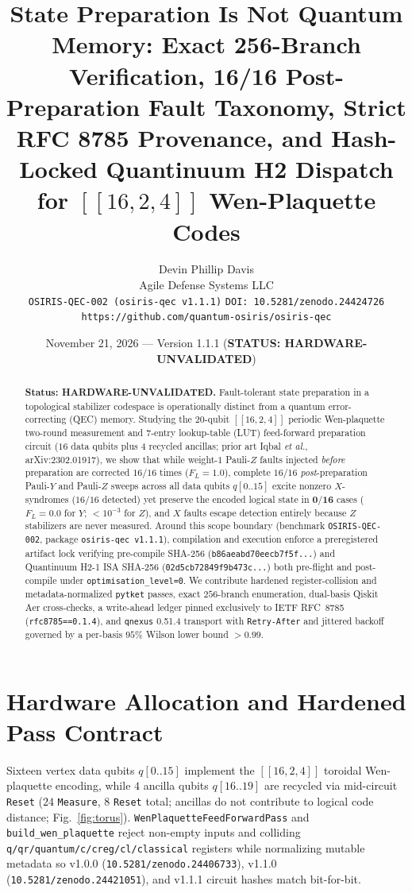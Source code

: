 \documentclass[10pt,twocolumn]{article}
\title{\textbf{State Preparation Is Not Quantum Memory: Exact 256-Branch Verification, 16/16 Post-Preparation Fault Taxonomy, Strict RFC 8785 Provenance, and Hash-Locked Quantinuum H2 Dispatch for $[[16, 2, 4]]$ Wen-Plaquette Codes}}
\author{Devin Phillip Davis\\Agile Defense Systems LLC\\\texttt{OSIRIS-QEC-002 (osiris-qec v1.1.1)} \quad \texttt{DOI: 10.5281/zenodo.24424726} \quad \texttt{https://github.com/quantum-osiris/osiris-qec}}
\date{November 21, 2026 --- Version 1.1.1 (\textbf{STATUS: HARDWARE-UNVALIDATED})}
\begin{document}
\maketitle

\begin{abstract}
\noindent\textbf{Status: HARDWARE-UNVALIDATED.} Fault-tolerant state preparation in a topological stabilizer codespace is operationally distinct from a quantum error-correcting (QEC) memory. Studying the $20$-qubit $[[16,2,4]]$ periodic Wen-plaquette two-round measurement and $7$-entry lookup-table (LUT) feed-forward preparation circuit ($16$ data qubits plus $4$ recycled ancillas; prior art Iqbal \emph{et al.}, arXiv:2302.01917), we show that while weight-$1$ Pauli-$Z$ faults injected \emph{before} preparation are corrected $16/16$ times ($F_L=1.0$), complete $16/16$ \emph{post}-preparation Pauli-$Y$ and Pauli-$Z$ sweeps across all data qubits $q[0..15]$ excite nonzero $X$-syndromes ($16/16$ detected) yet preserve the encoded logical state in $\mathbf{0/16}$ cases ($F_L=0.0$ for $Y$; $<10^{-3}$ for $Z$), and $X$ faults escape detection entirely because $Z$ stabilizers are never measured. Around this scope boundary (benchmark \texttt{OSIRIS-QEC-002}, package \texttt{osiris-qec v1.1.1}), compilation and execution enforce a preregistered artifact lock verifying pre-compile SHA-256 (\texttt{b86aeabd70eecb7f5f...}) and Quantinuum H2-1 ISA SHA-256 (\texttt{02d5cb72849f9b473c...}) both pre-flight and post-compile under \texttt{optimisation\_level=0}. We contribute hardened register-collision and metadata-normalized \texttt{pytket} passes, exact $256$-branch enumeration, dual-basis Qiskit Aer cross-checks, a write-ahead ledger pinned exclusively to IETF RFC~8785 (\texttt{rfc8785==0.1.4}), and \texttt{qnexus} 0.51.4 transport with \texttt{Retry-After} and jittered backoff governed by a per-basis $95\%$ Wilson lower bound $>0.99$.
\end{abstract}

\section{Hardware Allocation and Hardened Pass Contract}
Sixteen vertex data qubits $q[0..15]$ implement the $[[16,2,4]]$ toroidal Wen-plaquette encoding, while $4$ ancilla qubits $q[16..19]$ are recycled via mid-circuit \texttt{Reset} ($24$ \texttt{Measure}, $8$ \texttt{Reset} total; ancillas do not contribute to logical code distance; Fig.~\ref{fig:torus}). \texttt{WenPlaquetteFeedForwardPass} and \texttt{build\_wen\_plaquette} reject non-empty inputs and colliding \texttt{q/qr/quantum/c/creg/cl/classical} registers while normalizing mutable metadata so v1.0.0 (\texttt{10.5281/zenodo.24406733}), v1.1.0 (\texttt{10.5281/zenodo.24421051}), and v1.1.1 circuit hashes match bit-for-bit.
\end{document}

